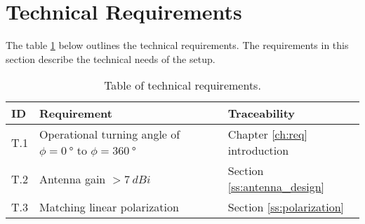 \section{Technical Requirements}
The table \ref{tab:tech_req} below outlines the technical requirements. The requirements in this section describe the technical needs of the setup.
\begin{table}[H]
    \centering
    \begin{tabular}{p{}|>{\raggedright}p{}|p{}}
        \textbf{ID} & \textbf{Requirement} & \textbf{Traceability} \\
        \hline
        \hline
        T.1 & Operational turning angle of $\phi = \SI{0}{\degree}$ to $\phi = \SI{360}{\degree}$ & Chapter \ref{ch:req} introduction \\
        T.2 & Antenna gain $>\SI{7}{dBi}$ & Section \ref{ss:antenna_design} \\
        T.3 & Matching linear polarization & Section \ref{ss:polarization} \\
    \end{tabular}
    \caption{Table of technical requirements.}
    \label{tab:tech_req}
\end{table}

